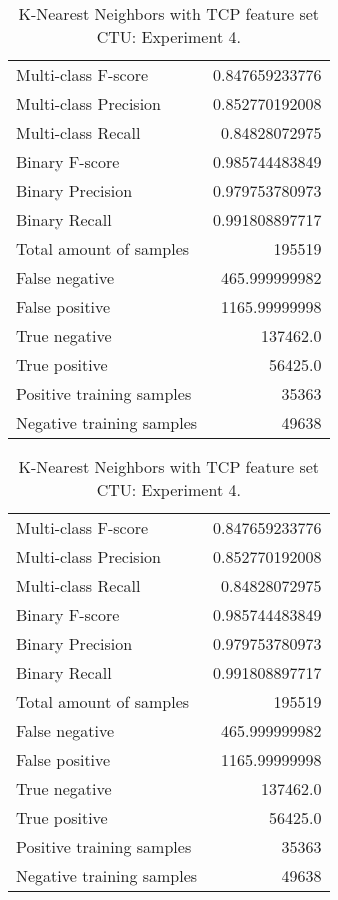 \begin{table}[H]
\begin{minipage}{0.5\textwidth}
\caption{K-Nearest Neighbors with TCP feature set CTU: Experiment 3.}
\centering
\begin{tabular}{l r}
\toprule
Multi-class F-score & 0.847659233776 \\
Multi-class Precision & 0.852770192008 \\
Multi-class Recall & 0.84828072975 \\
\midrule
Binary F-score & 0.985744483849 \\
Binary Precision & 0.979753780973 \\
Binary Recall & 0.991808897717 \\
\midrule
Total amount of samples & 195519 \\
False negative & 465.999999982 \\
False positive & 1165.99999998 \\
True negative & 137462.0 \\
True positive & 56425.0 \\
\midrule
Positive training samples & 35363 \\
Negative training samples & 49638 \\
\bottomrule
\end{tabular}
\end{minipage}
\hfillx
\begin{minipage}{0.5\textwidth}
\caption{K-Nearest Neighbors with TCP feature set CTU: Experiment 4.}
\centering
\begin{tabular}{l r}
\toprule
Multi-class F-score & 0.847659233776 \\
Multi-class Precision & 0.852770192008 \\
Multi-class Recall & 0.84828072975 \\
\midrule
Binary F-score & 0.985744483849 \\
Binary Precision & 0.979753780973 \\
Binary Recall & 0.991808897717 \\
\midrule
Total amount of samples & 195519 \\
False negative & 465.999999982 \\
False positive & 1165.99999998 \\
True negative & 137462.0 \\
True positive & 56425.0 \\
\midrule
Positive training samples & 35363 \\
Negative training samples & 49638 \\
\bottomrule
\end{tabular}
\end{minipage}
\end{table}

